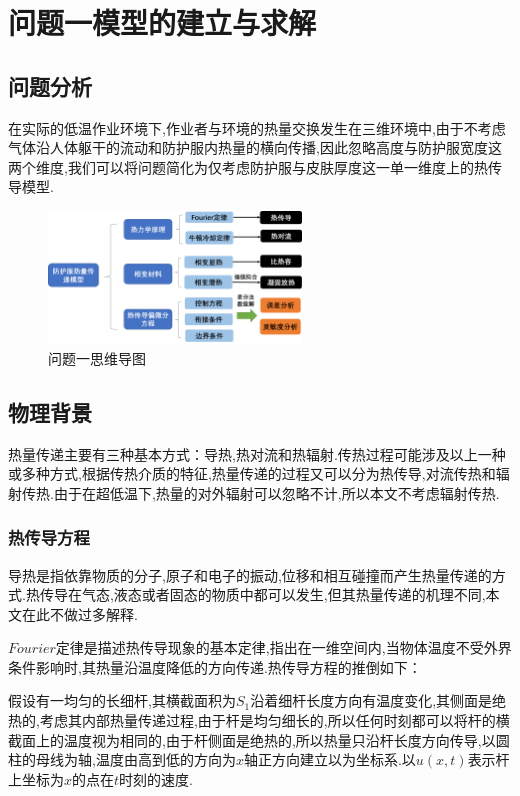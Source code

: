 \documentclass{whutmod}
\begin{document}
\section{问题一模型的建立与求解}
\subsection{问题分析}
在实际的低温作业环境下,作业者与环境的热量交换发生在三维环境中,由于不考虑气体沿人体躯干的流动和防护服内热量的横向传播,因此忽略高度与防护服宽度这两个维度,我们可以将问题简化为仅考虑防护服与皮肤厚度这一单一维度上的热传导模型.
\begin{figure}[!htbp]
	\centering
	\includegraphics[width=0.6\textwidth]{map1.png}
	\caption{问题一思维导图}
\end{figure} 



\subsection{物理背景}
热量传递主要有三种基本方式：导热,热对流和热辐射.传热过程可能涉及以上一种或多种方式,根据传热介质的特征,热量传递的过程又可以分为热传导,对流传热和辐射传热.由于在超低温下,热量的对外辐射可以忽略不计,所以本文不考虑辐射传热.
\subsubsection{热传导方程}
导热是指依靠物质的分子,原子和电子的振动,位移和相互碰撞而产生热量传递的方式.热传导在气态,液态或者固态的物质中都可以发生,但其热量传递的机理不同,本文在此不做过多解释.

$Fourier$定律是描述热传导现象的基本定律,指出在一维空间内,当物体温度不受外界条件影响时,其热量沿温度降低的方向传递.热传导方程的推倒如下：

假设有一均匀的长细杆,其横截面积为$S_{1}$沿着细杆长度方向有温度变化,其侧面是绝热的,考虑其内部热量传递过程,由于杆是均匀细长的,所以任何时刻都可以将杆的横截面上的温度视为相同的,由于杆侧面是绝热的,所以热量只沿杆长度方向传导,以圆柱的母线为轴,温度由高到低的方向为$x$轴正方向建立以为坐标系.以$u(x,t)$表示杆上坐标为$x$的点在$t$时刻的速度.
\end{document}
